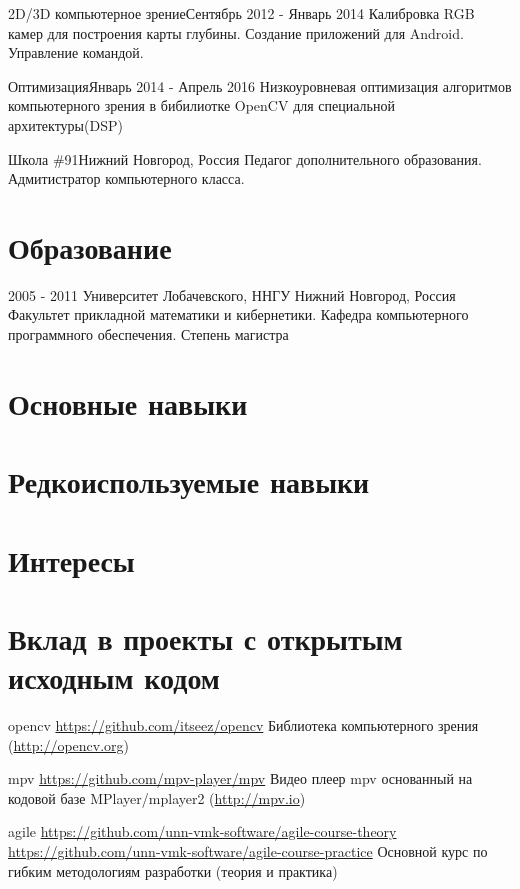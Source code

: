 \documentclass[12pt,a4paper]{moderncv}
\begin{document}
\cventry{}
	{2D/3D компьютерное зрение}{Сентябрь 2012 - Январь 2014}{} {}
	{Калибровка RGB камер для построения карты глубины. Создание приложений для Android. Управление командой.}

\cventry{}
	{Оптимизация}{Январь 2014 - Апрель 2016}{}{}
	{Низкоуровневая оптимизация алгоритмов компьютерного зрения в бибилиотке OpenCV для специальной архитектуры(DSP)}

	{Школа \#91}{Нижний Новгород, Россия}{}{}
	{Педагог дополнительного образования. Адмитистратор компьютерного класса.}

\section{Образование}
  \cventry
    {2005 - 2011}
    {Университет Лобачевского, ННГУ}
    {Нижний Новгород, Россия}
    {}{}
    {Факультет прикладной математики и кибернетики. Кафедра компьютерного программного обеспечения.\newline{}
    Степень магистра}


\section{Основные навыки}

\section{Редкоиспользуемые навыки}

\section{Интересы}


\section{Вклад в проекты с открытым исходным кодом}
\cvline
  {opencv}
  {\url{https://github.com/itseez/opencv}\newline{}
  Библиотека компьютерного зрения (\url{http://opencv.org})}

\cvline
  {mpv}
  {\url{https://github.com/mpv-player/mpv}\newline{}
  Видео плеер mpv основанный на кодовой базе MPlayer/mplayer2 \newline (\url{http://mpv.io})}

\cvline
  {agile}
  {
  \url{https://github.com/unn-vmk-software/agile-course-theory}\newline{}
  \url{https://github.com/unn-vmk-software/agile-course-practice}\newline{}
  Основной курс по гибким методологиям разработки (теория и практика)
  }
\end{document}
